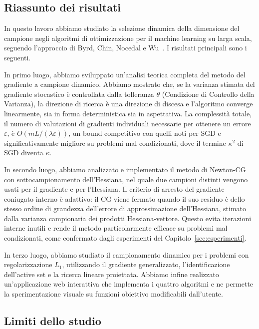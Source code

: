\documentclass[a4paper,12pt]{article}
\numberwithin{equation}{section}
\numberwithin{figure}{section}
\numberwithin{table}{section}
\begin{document}
\subsection{Riassunto dei risultati}

In questo lavoro abbiamo studiato la selezione dinamica della dimensione
del campione negli algoritmi di ottimizzazione per il machine learning su
larga scala, seguendo l'approccio di Byrd, Chin, Nocedal e Wu~\cite{byrd2012}.
I risultati principali sono i seguenti.

In primo luogo, abbiamo sviluppato un'analisi teorica completa del metodo del
gradiente a campione dinamico. Abbiamo mostrato che, se la varianza stimata
del gradiente stocastico è controllata dalla tolleranza $\theta$ (Condizione di
Controllo della Varianza), la direzione di ricerca è una direzione di discesa e
l'algoritmo converge linearmente, sia in forma deterministica sia in
aspettativa. La complessità totale, il numero di valutazioni di gradienti
individuali necessarie per ottenere un errore $\varepsilon$, è
$O(m L/(\lambda\varepsilon))$, un bound competitivo con quelli noti per SGD e
significativamente migliore su problemi mal condizionati, dove il termine
$\kappa^2$ di SGD diventa $\kappa$.

In secondo luogo, abbiamo analizzato e implementato il metodo di Newton-CG
con sottocampionamento dell'Hessiana, nel quale due campioni distinti
vengono usati per il gradiente e per l'Hessiana. Il criterio di arresto del
gradiente coniugato interno è adattivo: il CG viene fermato quando il suo
residuo è dello stesso ordine di grandezza dell'errore di approssimazione
dell'Hessiana, stimato dalla varianza campionaria dei prodotti
Hessiana-vettore. Questo evita iterazioni interne inutili e rende il metodo
particolarmente efficace su problemi mal condizionati, come confermato dagli
esperimenti del Capitolo~\ref{sec:esperimenti}.

In terzo luogo, abbiamo studiato il campionamento dinamico per i problemi con
regolarizzazione $L_1$, utilizzando il gradiente generalizzato, l'identificazione
dell'active set e la ricerca lineare proiettata. Abbiamo infine realizzato
un'applicazione web interattiva che implementa i quattro algoritmi e ne
permette la sperimentazione visuale su funzioni obiettivo modificabili
dall'utente.

\subsection{Limiti dello studio}
\end{document}
